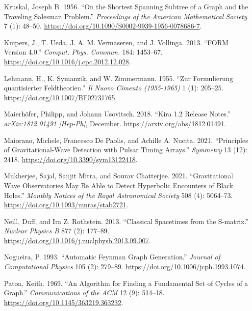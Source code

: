 \documentclass[
  11pt,
  a4paper,
  DIV=11,
  numbers=noendperiod,
  oneside]{scrreprt}
\newlength{\cslhangindent}
\newlength{\cslentryspacingunit} %
\newenvironment{CSLReferences}[2] %
 {%
  \setlength{\parindent}{0pt}
  \ifodd #1
  \let\oldpar\par
  \def\par{\hangindent=\cslhangindent\oldpar}
  \fi
  \setlength{\parskip}{#2\cslentryspacingunit}
 }%
 {}
\DeclareRobustCommand{\[}{\begin{equation}}
\DeclareRobustCommand{\]}{\end{equation}}
\begin{document}
\begin{CSLReferences}{1}{0}
\leavevmode{}%
Kruskal, Joseph B. 1956. {``On the Shortest Spanning Subtree of a Graph
and the Traveling Salesman Problem.''} \emph{Proceedings of the American
Mathematical Society} 7 (1): 48--50.
\url{https://doi.org/10.1090/S0002-9939-1956-0078686-7}.

\leavevmode{}%
Kuipers, J., T. Ueda, J. A. M. Vermaseren, and J. Vollinga. 2013.
{``{FORM} Version 4.0.''} \emph{Comput. Phys. Commun.} 184: 1453--67.
\url{https://doi.org/10.1016/j.cpc.2012.12.028}.

\leavevmode{}%
Lehmann, H., K. Symanzik, and W. Zimmermann. 1955. {``{Zur Formulierung
quantisierter Feldtheorien}.''} \emph{Il Nuovo Cimento (1955-1965)} 1
(1): 205--25. \url{https://doi.org/10.1007/BF02731765}.

\leavevmode{}%
Maierhöfer, Philipp, and Johann Usovitsch. 2018. {``Kira 1.2 {Release
Notes}.''} \emph{arXiv:1812.01491 {[}Hep-Ph{]}}, December.
\url{https://arxiv.org/abs/1812.01491}.

\leavevmode{}%
Maiorano, Michele, Francesco De Paolis, and Achille A. Nucita. 2021.
{``Principles of {Gravitational-Wave Detection} with {Pulsar Timing
Arrays}.''} \emph{Symmetry} 13 (12): 2418.
\url{https://doi.org/10.3390/sym13122418}.

\leavevmode{}%
Mukherjee, Sajal, Sanjit Mitra, and Sourav Chatterjee. 2021.
{``Gravitational {Wave} Observatories May Be Able to Detect Hyperbolic
Encounters of {Black Holes}.''} \emph{Monthly Notices of the Royal
Astronomical Society} 508 (4): 5064--73.
\url{https://doi.org/10.1093/mnras/stab2721}.

\leavevmode{}%
Neill, Duff, and Ira Z. Rothstein. 2013. {``Classical
Space\textendash times from the {S-matrix}.''} \emph{Nuclear Physics B}
877 (2): 177--89. \url{https://doi.org/10.1016/j.nuclphysb.2013.09.007}.

\leavevmode{}%
Nogueira, P. 1993. {``Automatic {Feynman Graph Generation}.''}
\emph{Journal of Computational Physics} 105 (2): 279--89.
\url{https://doi.org/10.1006/jcph.1993.1074}.

\leavevmode{}%
Paton, Keith. 1969. {``An Algorithm for Finding a Fundamental Set of
Cycles of a Graph.''} \emph{Communications of the ACM} 12 (9): 514--18.
\url{https://doi.org/10.1145/363219.363232}.


\end{CSLReferences}
\end{document}
